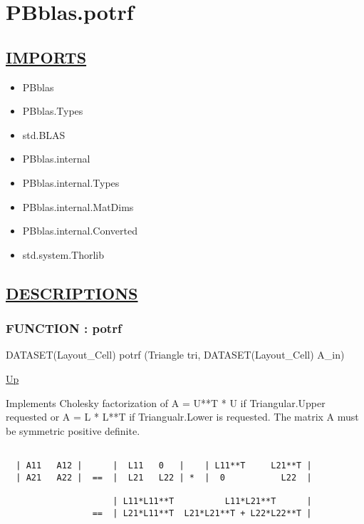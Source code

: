 \chapter*{PBblas.potrf}
\hypertarget{ecldoc:toc:PBblas.potrf}{}

\section*{\underline{IMPORTS}}
\begin{itemize}
\item PBblas
\item PBblas.Types
\item std.BLAS
\item PBblas.internal
\item PBblas.internal.Types
\item PBblas.internal.MatDims
\item PBblas.internal.Converted
\item std.system.Thorlib
\end{itemize}

\section*{\underline{DESCRIPTIONS}}
\subsection*{FUNCTION : potrf}
\hypertarget{ecldoc:pbblas.potrf}{}
\begin{minipage}[t]{\textwidth}
\begin{flushleft}
DATASET(Layout\_Cell) potrf (Triangle tri, DATASET(Layout\_Cell) A\_in)
\end{flushleft}
\end{minipage}
\hyperlink{ecldoc:toc:PBblas}{Up}

\par
Implements Cholesky factorization of A = U**T * U if Triangular.Upper requested or A = L * L**T if Triangualr.Lower is requested. The matrix A must be symmetric positive definite. 
\begin{verbatim}

  | A11   A12 |      |  L11   0   |    | L11**T     L21**T |
  | A21   A22 |  ==  |  L21   L22 | *  |  0           L22  |

                     | L11*L11**T          L11*L21**T      |
                 ==  | L21*L11**T  L21*L21**T + L22*L22**T |
 \end{verbatim}

